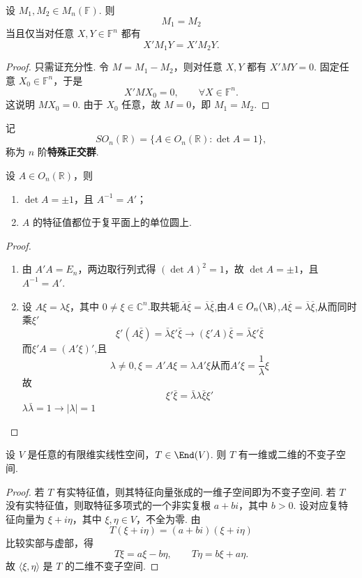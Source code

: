 \begin{lemma}
	设 $M_1,M_2\in M_n(\mathbb{F})$. 则
	\[
	M_1=M_2
	\]
	当且仅当对任意 $X,Y\in\mathbb{F}^n$ 都有
	\[
	X'M_1Y=X'M_2Y.
	\]
\end{lemma}
\begin{proof}
	只需证充分性. 令 $M=M_1-M_2$，则对任意 $X,Y$ 都有 $X'MY=0$. 固定任意 $X_0\in\mathbb{F}^n$，于是
	\[
	X'MX_0=0,
	\qquad \forall X\in\mathbb{F}^n.
	\]
	这说明 $MX_0=0$. 由于 $X_0$ 任意，故 $M=0$，即 $M_1=M_2$.
\end{proof}

\begin{definition}
	记
	\[
	SO_n(\mathbb{R})=\{A\in O_n(\mathbb{R}):\det A=1\},
	\]
	称为 $n$ 阶\textbf{特殊正交群}.
\end{definition}

\begin{lemma}
	设 $A\in O_n(\mathbb{R})$，则
	\begin{enumerate}
		\item $\det A=\pm1$，且 $A^{-1}=A'$；
		\item $A$ 的特征值都位于复平面上的单位圆上.
	\end{enumerate}
\end{lemma}
\begin{proof}
	\begin{enumerate}
		\item 由 $A'A=E_n$，两边取行列式得 $(\det A)^2=1$，故 $\det A=\pm1$，且 $A^{-1}=A'$.
		\item 设 $A\xi=\lambda\xi$，其中 $0\ne\xi\in\mathbb{C}^n$.取共轭$\overline{A} \overline{\xi}= \overline{\lambda}\overline{\xi}$,由$A\in O_n(\R)$,$A\overline{\xi}=\overline{\lambda}\overline{\xi}$,从而同时乘$\xi'$
		\[\xi'(A\bar{\xi}) = \bar{\lambda}\xi'\bar{\xi}\rightarrow (\xi'A)\bar{\xi} = \bar{\lambda}\xi'\bar{\xi}\]
		而$\xi'A = (A'\xi)'$,且
		\[\lambda \neq 0,\xi = A'A\xi = \lambda A'\xi \text{从而}A'\xi = \frac{1}{\lambda}\xi\]
		故\[\xi'\bar{\xi} =\bar{\lambda}\lambda\bar{\xi}\xi'\]
		$\lambda\bar{\lambda} =1 \rightarrow |\lambda|=1$
	\end{enumerate}
	

\end{proof}

\begin{lemma}
	设 $V$ 是任意的有限维实线性空间，$T\in\End(V)$. 则 $T$ 有一维或二维的不变子空间.
\end{lemma}
\begin{proof}
	若 $T$ 有实特征值，则其特征向量张成的一维子空间即为不变子空间.
	若 $T$ 没有实特征值，则取特征多项式的一个非实复根 $a+bi$，其中 $b>0$. 设对应复特征向量为 $\xi+i\eta$，其中 $\xi,\eta\in V$，不全为零. 由
	\[
	T(\xi+i\eta)=(a+bi)(\xi+i\eta)
	\]
	比较实部与虚部，得
	\[
	T\xi=a\xi-b\eta,
	\qquad
	T\eta=b\xi+a\eta.
	\]
	故 $\langle\xi,\eta\rangle$ 是 $T$ 的二维不变子空间.
\end{proof}

